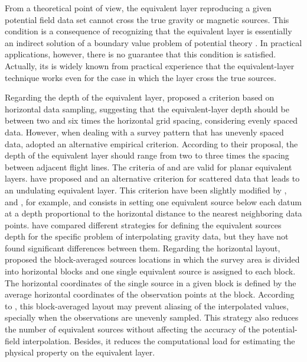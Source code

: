 \documentclass[utf8]{FrontiersinHarvard} %
\begin{document}
	From a theoretical point of view, the equivalent layer reproducing a given potential field data set cannot cross the
	true gravity or magnetic sources. This condition is a consequence of recognizing that the equivalent layer is essentially an indirect solution of 
	a boundary value problem of potential theory \citep[e.g.,][]{roy1962,zidarov1965,dampney1969,li_etal_2014,reis-etal2020}.
	In practical applications, however, there is no guarantee that this condition is satisfied. 
	Actually, its is widely known from practical experience \cite[e.g.,][]{gonzalez-etal2022} that the equivalent-layer technique
	works even for the case in which the layer cross the true sources. 
	
	Regarding the depth of the equivalent layer, \citet{dampney1969}  proposed a criterion based on horizontal data sampling, 
	suggesting that the equivalent-layer depth should be between two and six times the horizontal grid spacing, 
	considering evenly spaced data. 
	However, when dealing with a survey pattern that has unevenly spaced data, \citet{reis-etal2020} adopted an alternative 
	empirical criterion. 
	According to their proposal, the depth of the equivalent layer should range from two to three times the spacing between 
	adjacent flight lines.
	The criteria of \citet{dampney1969} and \citet{reis-etal2020} are valid for planar equivalent layers. 
	\citet{cordell1992} have proposed and an alternative criterion for scattered data that leads to an undulating equivalent layer.
	This criterion have been slightly modified by \citet{guspi-etal2004}, \citet{guspi-novara2009} and \citet{soler-uieda2021},
	for example, and consists in setting one equivalent source below each datum at a depth 
	proportional to the horizontal distance to the nearest neighboring data points.
	\citet{soler-uieda2021} have compared different strategies for defining the equivalent sources depth for the specific
	problem of interpolating gravity data, but they have not found significant differences between them.
	Regarding the horizontal layout, \cite{soler-uieda2021} proposed the block-averaged sources locations 
	in which the survey area is divided into horizontal blocks and one single equivalent source is assigned to each block. 
	The horizontal coordinates of the single source in a given block is defined by the average horizontal 
	coordinates of the observation points at the block. 
	According to \cite{soler-uieda2021}, this block-averaged layout may prevent aliasing of the interpolated 
	values, specially when the observations are unevenly sampled.
	This strategy also reduces the number of equivalent sources without affecting the accuracy of the potential-field interpolation. 
	Besides, it reduces the computational load for estimating the physical property on the equivalent layer.
	
\end{document}
